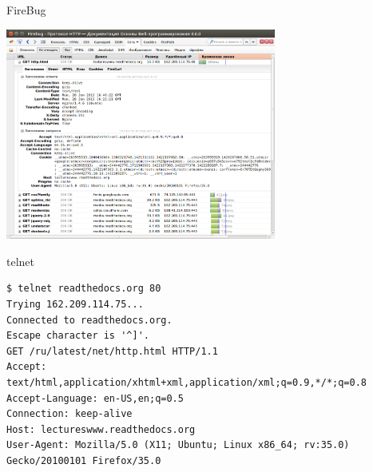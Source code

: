 \documentclass[c,unicode,russian]{beamer}
\begin{document}
\begin{frame}{FireBug}
 \begin{center}
     \includegraphics[width=3.5in]{media/firebug1.png}
 \end{center}
\end{frame}

\begin{frame}[fragile]{telnet}
    \begin{Verbatim}[fontsize=\scriptsize]
$ telnet readthedocs.org 80
Trying 162.209.114.75...
Connected to readthedocs.org.
Escape character is '^]'.
GET /ru/latest/net/http.html HTTP/1.1
Accept: text/html,application/xhtml+xml,application/xml;q=0.9,*/*;q=0.8
Accept-Language: en-US,en;q=0.5
Connection: keep-alive
Host: lectureswww.readthedocs.org
User-Agent: Mozilla/5.0 (X11; Ubuntu; Linux x86_64; rv:35.0) Gecko/20100101 Firefox/35.0
    \end{Verbatim}
\end{frame}
\end{document}
